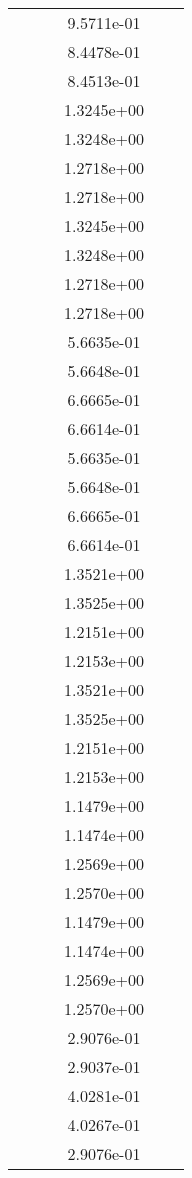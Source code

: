 \begin{xltabular}{\textwidth}{r|rS[table-format=1.3e+2]S[table-format=1.4e+2]S[table-format=1.4e+2]S[table-format=-1.5]}
&  &  & 9.5711e-01 & & \\
&  &  & 8.4478e-01 & & \\
&  &  & 8.4513e-01 & & \\
&  &  & 1.3245e+00 & & \\
&  &  & 1.3248e+00 & & \\
&  &  & 1.2718e+00 & & \\
&  &  & 1.2718e+00 & & \\
&  &  & 1.3245e+00 & & \\
&  &  & 1.3248e+00 & & \\
&  &  & 1.2718e+00 & & \\
&  &  & 1.2718e+00 & & \\
&  &  & 5.6635e-01 & & \\
&  &  & 5.6648e-01 & & \\
&  &  & 6.6665e-01 & & \\
&  &  & 6.6614e-01 & & \\
&  &  & 5.6635e-01 & & \\
&  &  & 5.6648e-01 & & \\
&  &  & 6.6665e-01 & & \\
&  &  & 6.6614e-01 & & \\
&  &  & 1.3521e+00 & & \\
&  &  & 1.3525e+00 & & \\
&  &  & 1.2151e+00 & & \\
&  &  & 1.2153e+00 & & \\
&  &  & 1.3521e+00 & & \\
&  &  & 1.3525e+00 & & \\
&  &  & 1.2151e+00 & & \\
&  &  & 1.2153e+00 & & \\
&  &  & 1.1479e+00 & & \\
&  &  & 1.1474e+00 & & \\
&  &  & 1.2569e+00 & & \\
&  &  & 1.2570e+00 & & \\
&  &  & 1.1479e+00 & & \\
&  &  & 1.1474e+00 & & \\
&  &  & 1.2569e+00 & & \\
&  &  & 1.2570e+00 & & \\
&  &  & 2.9076e-01 & & \\
&  &  & 2.9037e-01 & & \\
&  &  & 4.0281e-01 & & \\
&  &  & 4.0267e-01 & & \\
&  &  & 2.9076e-01 & & \\

\end{xltabular}
